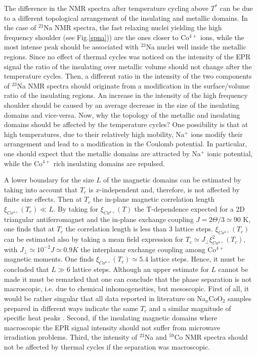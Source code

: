 \documentclass[prb,showpacs,preprintnumbers,amsmath,amssymb,floatfix]{revtex4}
\begin{document}
The difference in the NMR spectra after temperature cycling above
$T^*$ can be due to a different topological arrangement of the
insulating and metallic domains. In the case of $^{23}$Na NMR
spectra, the fast relaxing nuclei yielding the high frequency
shoulder (see Fig.\ref{spna})) are the ones closer to Co$^{4+}$
ions, while the most intense peak should be associated with
$^{23}$Na nuclei well inside the metallic regions. Since no effect
of thermal cycles was noticed on the intensity of the EPR signal
the ratio of the insulating over metallic volume should not change
after the temperature cycles. Then, a different ratio in the
intensity of the two components of $^{23}$Na NMR spectra should
originate from a modification in the surface/volume ratio of the
insulating regions. An increase in the intensity of the high
frequency shoulder should be caused by an average decrease in the
size of the insulating domains and vice-versa. Now, why the
topology of the metallic and insulating domains should be affected
by the temperature cycles? One possibility is that at high
temperatures, due to their relatively high mobility, Na$^+$ ions
modify their arrangement and lead to a modification in the Coulomb
potential. In particular, one should expect that the metallic
domains are attracted by Na$^+$ ionic potential, while the
Co$^{4+}$ rich insulating domains are repulsed.

A lower boundary for the size $L$ of the magnetic domains can be
estimated by taking into account that $T_c$ is $x$-independent
and, therefore, is not affected by finite size effects. Then at
$T_c$ the in-plane magnetic correlation length
$\xi_{Co^{4+}}(T_c)\ll L$. By taking for $\xi_{Co^{4+}}(T)$ the
T-dependence expected for a 2D triangular antiferromagnet and the
in-plane exchange coupling $J= 2\Theta/3\simeq 90$ K, one finds
\cite{ChiTALAF} that at $T_c$ the correlation length is less than
$3$ lattice steps. $\xi_{Co^{4+}}(T_c)$ can be estimated also by
taking a mean field expression for $T_c\simeq
J_{\perp}\xi^2_{Co^{4+}}(T_c)$, with $J_{\perp}\simeq 10^{-2}
J\simeq 0.9 K$ \cite{resist} the interplanar exchange coupling
among Co$^{4+}$ magnetic moments. One finds
$\xi_{Co^{4+}}(T_c)\simeq 5.4$ lattice steps. Hence, it must be
concluded that $L\gg 6$ lattice steps. Although an upper estimate
for $L$ cannot be made it must be remarked that one can conclude
that the phase separation is not macroscopic, i.e. due to chemical
inhomogeneities, but mesoscopic. First of all, it would be rather
singular that all data reported in literature on Na$_x$CoO$_2$
samples prepared in different ways indicate the same $T_c$ and a
similar magnitude of specific heat peaks \cite{Moto,Batlogg}.
Second, if the insulating magnetic domains where macroscopic the
EPR signal intensity should not suffer from microwave irradiation
problems. Third, the intensity of $^{23}$Na and $^{59}$Co NMR
spectra should not be affected by thermal cycles if the separation
was macroscopic.
\end{document}
